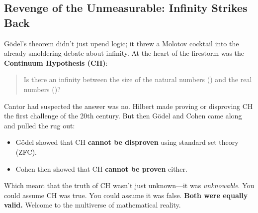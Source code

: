 \subsection{Revenge of the Unmeasurable: Infinity Strikes Back}

Gödel’s theorem didn’t just upend logic; it threw a Molotov cocktail into the already-smoldering debate about infinity. At the heart of the firestorm was the \textbf{Continuum Hypothesis (CH)}:

\begin{quote}
Is there an infinity between the size of the natural numbers () and the real numbers ()?
\end{quote}

Cantor had suspected the answer was no. Hilbert made proving or disproving CH the first challenge of the 20th century. But then Gödel and Cohen came along and pulled the rug out:

\begin{itemize}
\item Gödel showed that CH \textbf{cannot be disproven} using standard set theory (ZFC).
\item Cohen then showed that CH \textbf{cannot be proven} either.
\end{itemize}

Which meant that the truth of CH wasn’t just unknown—it was \textit{unknowable}. You could assume CH was true. You could assume it was false. \textbf{Both were equally valid.} Welcome to the multiverse of mathematical reality.
